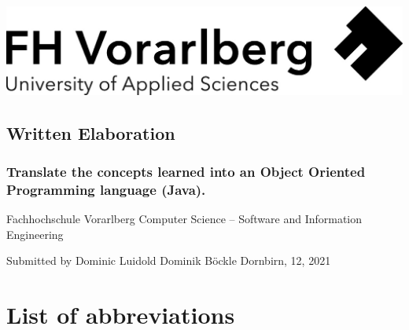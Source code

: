 \documentclass[a4paper,12pt,twoside]{scrreprt}
\begin{document}
\cleardoublepage   %
\thispagestyle{empty}
\begin{titlepage}
  \begin{flushright}
  \includegraphics[width=0.9\linewidth]{Logo-A3}
  \end{flushright}
  \begin{flushleft}
  \section*{Written Elaboration}
  \subsection*{Translate the concepts learned into an Object Oriented Programming language (Java).}


  \vspace{1cm}
  Fachhochschule Vorarlberg\newline
  Computer Science – Software and Information Engineering
  
  \vspace{1cm}
  Submitted by\newline
  Dominic Luidold\newline
  Dominik Böckle\newline
  Dornbirn, 12, 2021
  \end{flushleft}
\end{titlepage}




\cleardoublepage   %
\tableofcontents

\clearpage
{}
{}
\listoffigures

\clearpage
{}
{}  %
\chapter*{List of abbreviations} 
\begin{acronym}
\end{acronym}
\end{document}
